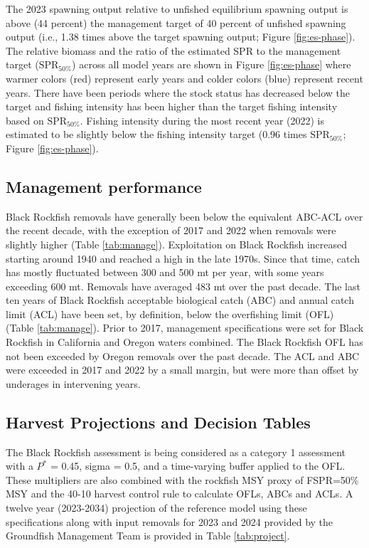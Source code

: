 \documentclass[11pt,
  english,
  letterpaper,
]{article}
\begin{document}
The 2023 spawning output relative to unfished equilibrium spawning output is above (44 percent) the management target of 40 percent of unfished spawning output (i.e., 1.38 times above the target spawning output; Figure \ref{fig:es-phase}). The relative biomass and the ratio of the estimated SPR to the management target (\(\text{SPR}_{50\%}\)) across all model years are shown in Figure \ref{fig:es-phase} where warmer colors (red) represent early years and colder colors (blue) represent recent years. There have been periods where the stock status has decreased below the target and fishing intensity has been higher than the target fishing intensity based on \(\text{SPR}_{50\%}\). Fishing intensity during the most recent year (2022) is estimated to be slightly below the fishing intensity target (0.96 times \(\text{SPR}_{50\%}\); Figure \ref{fig:es-phase}).

\hypertarget{management-performance-1}{%
\subsection{Management performance}\label{management-performance-1}}

Black Rockfish removals have generally been below the equivalent ABC-ACL over the recent decade, with the exception of 2017 and 2022 when removals were slightly higher (Table \ref{tab:manage}). Exploitation on Black Rockfish increased starting around 1940 and reached a high in the late 1970s. Since that time, catch has mostly fluctuated between 300 and 500 mt per year, with some years exceeding 600 mt. Removals have averaged 483 mt over the past decade. The last ten years of Black Rockfish acceptable biological catch (ABC) and annual catch limit (ACL) have been set, by definition, below the overfishing limit (OFL) (Table \ref{tab:manage}). Prior to 2017, management specifications were set for Black Rockfish in California and Oregon waters combined. The Black Rockfish OFL has not been exceeded by Oregon removals over the past decade. The ACL and ABC were exceeded in 2017 and 2022 by a small margin, but were more than offset by underages in intervening years.

\hypertarget{harvest-projections-and-decision-tables}{%
\subsection{Harvest Projections and Decision Tables}\label{harvest-projections-and-decision-tables}}

The Black Rockfish assessment is being considered as a category 1 assessment with a \(P^*\) = 0.45, sigma = 0.5, and a time-varying buffer applied to the OFL. These multipliers are also combined with the rockfish MSY proxy of FSPR=50\% MSY and the 40-10 harvest control rule to calculate OFLs, ABCs and ACLs. A twelve year (2023-2034) projection of the reference model using these specifications along with input removals for 2023 and 2024 provided by the Groundfish Management Team is provided in Table \ref{tab:project}.
\end{document}
